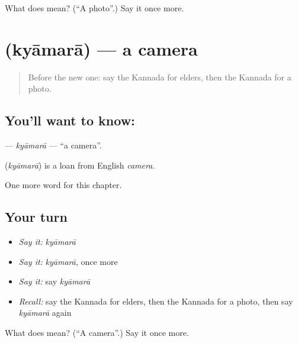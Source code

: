 \begin{tcolorbox}[breakable,colback=teal!4,colframe=teal!35!black,title={Before you move on}]
What does  mean? (\textquotedblleft{}A photo\textquotedblright{}.) Say it once more.
\end{tcolorbox}
\section[\texorpdfstring{\kn{ಕ್ಯಾಮರಾ} (kyāmarā)}{ಕ್ಯಾಮರಾ (kyāmarā)}]{ (kyāmarā) — a camera}

\label{lesson:KA-C300-kyamara}



\begin{quote}
Before the new one: say the Kannada for elders, then the Kannada for a photo.
\end{quote}

\subsection*{You'll want to know: }
\textbf{} — \emph{kyāmarā} — \textquotedblleft{}a camera\textquotedblright{}.

\begin{cousinweb}
\textbf{} (\emph{kyāmarā}) is a loan from English \emph{camera}.
\end{cousinweb}

\begin{grammarlens}[title={What you've built}]
One more word for this chapter.
\end{grammarlens}

\subsection*{Your turn}
\begin{itemize}
\raggedright
  \item \emph{Say it:} \emph{kyāmarā}
  \item \emph{Say it:} \emph{kyāmarā}, once more
  \item \emph{Say it:} say \emph{kyāmarā}
  \item \emph{Recall:} say the Kannada for elders, then the Kannada for a photo, then say \emph{kyāmarā} again
\end{itemize}

\begin{tcolorbox}[breakable,colback=teal!4,colframe=teal!35!black,title={Before you move on}]
What does  mean? (\textquotedblleft{}A camera\textquotedblright{}.) Say it once more.
\end{tcolorbox}
